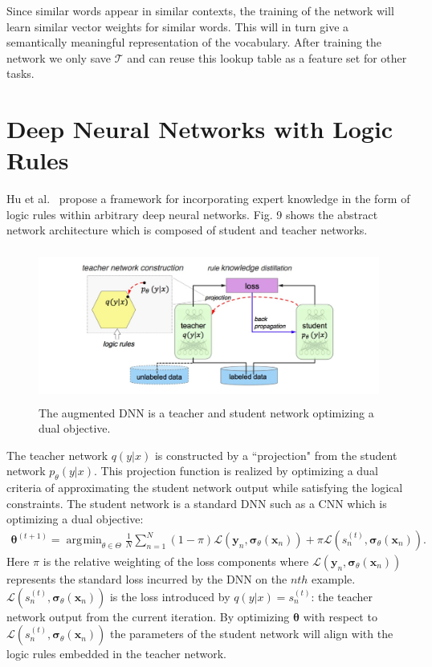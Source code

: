 \documentclass[11pt]{article}
\DeclareMathOperator*{\argmin}{\arg\!\min}
\begin{document}
Since similar words appear in similar contexts, the training of the network will learn similar vector weights for similar words.  This will in turn give a semantically meaningful representation of the vocabulary.  After training the network we only save $\mathcal{T}$ and can reuse this lookup table as a feature set for other tasks.
 
\section{Deep Neural Networks with Logic Rules}

Hu et al.~\cite{Hu2016HarnessingDN} propose a framework for incorporating expert knowledge in the form of logic rules within arbitrary deep neural networks.  Fig. 9 shows the abstract network architecture which is composed of student and teacher networks.
\begin{figure}
	\begin{center}
		\includegraphics[width=12cm, height=5cm]{teacher_dnn}
	\end{center}
	\caption{The augmented DNN is a teacher and student network optimizing a dual objective.}
\end{figure}
The teacher network $q(y|x)$ is constructed by a ``projection" from the student network $p_\theta(y|x)$.  This projection function is realized by optimizing a dual criteria of approximating the student network output while satisfying the logical constraints.  The student network is a standard DNN such as a CNN which is optimizing a dual objective:
\begin{gather}
\boldsymbol{\theta}^{(t + 1)} = \argmin_{\theta \in \Theta} \frac{1}{N} \sum_{n = 1}^{N} (1 - \pi) \mathcal{L}(\textbf{y}_n, \boldsymbol{\sigma}_{\theta}(\textbf{x}_{n})) + \pi \mathcal{L}(s_n^{(t)}, \boldsymbol{\sigma}_{\theta}(\textbf{x}_n)).
\end{gather}
Here $\pi$ is the relative weighting of the loss components where $\mathcal{L}(\textbf{y}_n, \boldsymbol{\sigma}_{\theta}(\textbf{x}_{n}))$ represents the standard loss incurred by the DNN on the $nth$ example.  $\mathcal{L}(s_n^{(t)}, \boldsymbol{\sigma}_{\theta}(\textbf{x}_n))$ is the loss introduced by $q(y|x) = s_n^{(t)}$: the teacher network output from the current iteration.  By optimizing $\boldsymbol{\theta}$ with respect to $\mathcal{L}(s_n^{(t)}, \boldsymbol{\sigma}_{\theta}(\textbf{x}_n))$  the parameters of the student network will align with the logic rules embedded in the teacher network.
\end{document}
